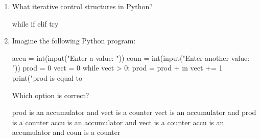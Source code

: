 \begin{enumerate}
\begin{choices}
\end{choices}



\item What iterative control structures in Python?

\begin{choices}
    \choice while %
    \choice if
    \choice elif
    \choice try
\end{choices}


\item Imagine the following Python program:

\begin{python}
accu = int(input("Enter a value: "))
coun = int(input("Enter another value: "))
prod = 0
vect = 0
while vect > 0: 
    prod = prod + m
    vect += 1 
print("prod is equal to %
\end{python}

Which option is correct?



\begin{choices}
    \choice prod is an accumulator and vect is a counter %
    \choice vect is an accumulator and prod is a counter
    \choice accu is an accumulator and vect is a counter
    \choice accu is an accumulator and coun is a counter
\end{choices}



\end{enumerate}


